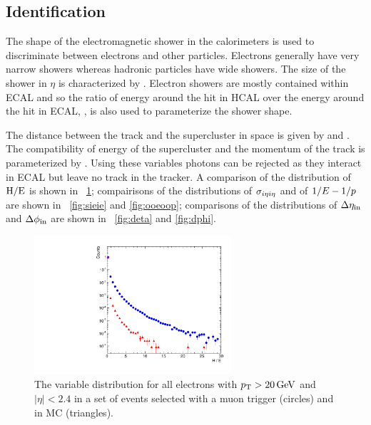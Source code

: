 \subsection{Identification}

The shape of the electromagnetic shower in the calorimeters is used to
discriminate between electrons and other particles. Electrons generally have
very narrow showers whereas hadronic particles have wide showers. The size of
the shower in $\eta$ is characterized by \sigmaietaieta. Electron showers are
mostly contained within ECAL and so the ratio of energy around the hit in HCAL
over the energy around the hit in ECAL, \HOverE, is also used to parameterize
the shower shape.

The distance between the track and the supercluster in \coordetaphi space is
given by \dphiin and \detain. The compatibility of energy of the supercluster
and the momentum of the track is parameterized by \ooeoop. Using these
variables photons can be rejected as they interact in ECAL but leave no track
in the tracker. A comparison of the distribution of $\text{H}/\text{E}$ is shown in
\FIG~\ref{fig:he}; compairisons of the distributions of $\sigma_{i \eta i \eta}$ and of
$1/E - 1/p$ are shown in \FIGS~\ref{fig:sieie} and \ref{fig:ooeoop}; comparisons
of the distributions of $\Delta \eta_{\text{in}}$ and $\Delta \phi_{\text{in}}$ are shown in
\FIGS~\ref{fig:deta} and \ref{fig:dphi}.

\begin{figure}[!htbp]
    \centering
    \includegraphics[width=0.65\textwidth]{figures/he.pdf}
    \caption{
        The \HOverE variable distribution for all electrons with $p_{\mathrm{T}} > 20
        \,\text{Ge\hspace{-.08em}V}$ and $|\eta| < 2.4$ in a set of events selected with a muon
        trigger (circles) and in \MADGRAPH \Ztoee MC (triangles).
    }
    \label{fig:he}
\end{figure}

